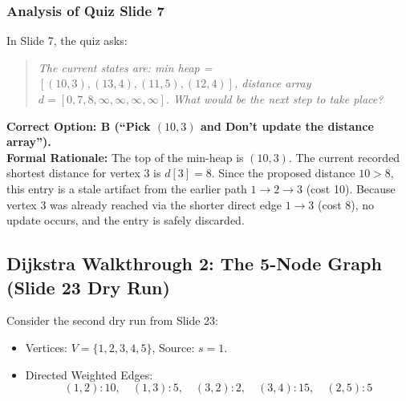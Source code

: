 \documentclass[10pt,journal,compsoc,onecolumn]{IEEEtran}
\begin{document}
\subsubsection{Analysis of Quiz Slide 7}
In Slide 7, the quiz asks:
\begin{quote}
\emph{The current states are: min heap = $[ (10, 3), (13, 4), (11, 5), (12, 4) ]$, distance array $d = [0, 7, 8, \infty, \infty, \infty, \infty]$. What would be the next step to take place?}
\end{quote}
\textbf{Correct Option: B (``Pick $(10, 3)$ and Don't update the distance array'').} \\
\textbf{Formal Rationale:} The top of the min-heap is $(10, 3)$. The current recorded shortest distance for vertex 3 is $d[3] = 8$. Since the proposed distance $10 > 8$, this entry is a stale artifact from the earlier path $1 \to 2 \to 3$ (cost 10). Because vertex 3 was already reached via the shorter direct edge $1 \to 3$ (cost 8), no update occurs, and the entry is safely discarded.

\subsection{Dijkstra Walkthrough 2: The 5-Node Graph (Slide 23 Dry Run)}
Consider the second dry run from Slide 23:
\begin{itemize}
    \item Vertices: $V = \{1, 2, 3, 4, 5\}$, Source: $s = 1$.
    \item Directed Weighted Edges:
    \begin{equation*}
    (1, 2) : 10, \quad (1, 3) : 5, \quad (3, 2) : 2, \quad (3, 4) : 15, \quad (2, 5) : 5
    \end{equation*}
\end{itemize}
\end{document}
